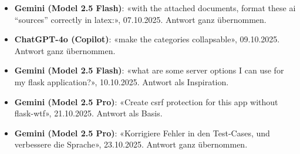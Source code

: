 \documentclass[12pt, a4paper]{article}
\begin{document}
\begin{itemize}
    \item \textbf{Gemini (Model 2.5 Flash)}: «with the attached documents, format these ai ``sources'' correctly in latex:», 07.10.2025. Antwort ganz übernommen.
    
    \item \textbf{ChatGPT-4o (Copilot)}: «make the categories collapsable», 09.10.2025. Antwort ganz übernommen.

    \item \textbf{Gemini (Model 2.5 Flash)}: «what are some server options I can use for my flask application?», 10.10.2025. Antwort als Inspiration.

    \item \textbf{Gemini (Model 2.5 Pro)}: «Create csrf protection for this app without flask-wtf», 21.10.2025. Antwort als Basis.

    \item \textbf{Gemini (Model 2.5 Pro)}: «Korrigiere Fehler in den Test-Cases, und verbessere die Sprache», 23.10.2025. Antwort ganz übernommen.
    
\end{itemize}
\end{document}
